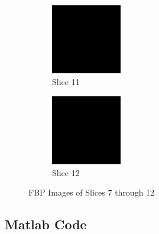 \documentclass{article}
\begin{document}
\begin{figure}[t!]
\medskip
\begin{subfigure}{0.45\textwidth}
\includegraphics[width=\linewidth]{s_11.png}
\caption{Slice 11} \label{fig:e}
\end{subfigure}\hspace*{\fill}
\begin{subfigure}{0.45\textwidth}
\includegraphics[width=\linewidth]{s_12.png}
\caption{Slice 12} \label{fig:f}
\end{subfigure}

\caption{FBP Images of Slices 7 through 12} \label{fig:1}
\end{figure}



\subsection{Matlab Code}

\end{document}
